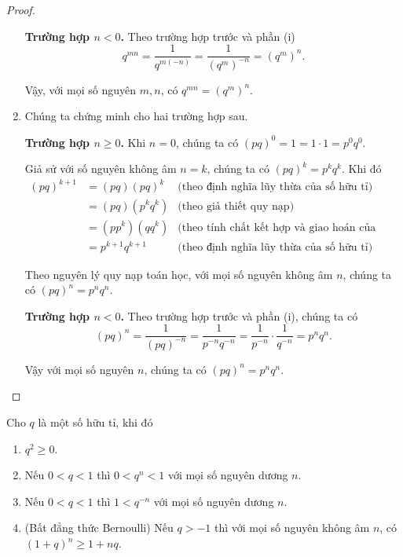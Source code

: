 \begin{proof}
\begin{enumerate}[label={(\roman*)}]
              \textbf{Trường hợp $n < 0$.} Theo trường hợp trước và phần (i)
              \[
                  q^{mn} = \frac{1}{q^{m(-n)}} = \frac{1}{{(q^{m})}^{-n}} = {(q^{m})}^{n}.
              \]

              Vậy, với mọi số nguyên $m, n$, có $q^{mn} = {(q^{m})}^{n}$.
        \item Chúng ta chứng minh cho hai trường hợp sau.

              \textbf{Trường hợp $n\geq 0$.} Khi $n = 0$, chúng ta có ${(pq)}^{0} = 1 = 1\cdot 1 = p^{0}q^{0}$.

              Giả sử với số nguyên không âm $n = k$, chúng ta có ${(pq)}^{k} = p^{k}q^{k}$. Khi đó
              \begin{align*}
                  {(pq)}^{k+1} & = {(pq)}{(pq)}^{k}     & \text{(theo định nghĩa lũy thừa của số hữu tỉ)}                      \\
                               & = {(pq)}{(p^{k}q^{k})} & \text{(theo giả thiết quy nạp)}                                      \\
                               & = (pp^{k})(qq^{k})     & \text{(theo tính chất kết hợp và giao hoán của phép nhân số hữu tỉ)} \\
                               & = p^{k+1}q^{k+1}       & \text{(theo định nghĩa lũy thừa của số hữu tỉ)}
              \end{align*}

              Theo nguyên lý quy nạp toán học, với mọi số nguyên không âm $n$, chúng ta có ${(pq)}^{n} = p^{n}q^{n}$.

              \textbf{Trường hợp $n < 0$.} Theo trường hợp trước và phần (i), chúng ta có
              \[
                  {(pq)}^{n} = \frac{1}{{(pq)}^{-n}} = \frac{1}{p^{-n}q^{-n}} = \frac{1}{p^{-n}}\cdot\frac{1}{q^{-n}} = p^{n}q^{n}.
              \]

              Vậy với mọi số nguyên $n$, chúng ta có ${(pq)}^{n} = p^{n}q^{n}$.
    \end{enumerate}
\end{proof}

\begin{theorem}
    Cho $q$ là một số hữu tỉ, khi đó
    \begin{enumerate}[label={(\roman*)}]
        \item $q^{2}\geq 0$.
        \item Nếu $0 < q < 1$ thì $0 < q^{n} < 1$ với mọi số nguyên dương $n$.
        \item Nếu $0 < q < 1$ thì $1 < q^{-n}$ với mọi số nguyên dương $n$.
        \item (Bất đẳng thức Bernoulli) Nếu $q > -1$ thì với mọi số nguyên không âm $n$, có ${(1 + q)}^{n}\geq 1 + nq$.
    \end{enumerate}
\end{theorem}


